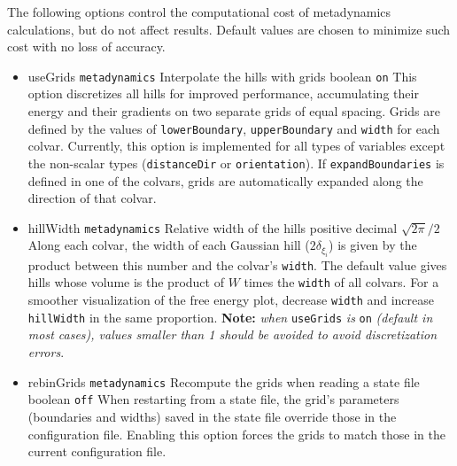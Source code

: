 \label{sec:colvarbias_meta_performance}
The following options control the computational cost of metadynamics calculations, but do not affect results.
Default values are chosen to minimize such cost with no loss of accuracy.

\begin{itemize}

\item %
  \keydef
    {useGrids}{%
    \texttt{metadynamics}}{%
    Interpolate the hills with grids}{%
    boolean}{%
    \texttt{on}}{%
    This option discretizes all hills for improved performance,
    accumulating their energy and their gradients on two separate grids
    of equal spacing.  Grids are defined by the values of
    \texttt{lowerBoundary}, \texttt{upperBoundary} and \texttt{width}
    for each colvar.  Currently, this option is implemented for all
    types of variables except the non-scalar types (\texttt{distanceDir}
    or \texttt{orientation}).  If \texttt{expandBoundaries} is defined
    in one of the colvars, grids are automatically expanded along the
    direction of that colvar.}

\item %
  \keydef
    {hillWidth}{%
    \texttt{metadynamics}}{%
    Relative width of the hills}{%
    positive decimal}{%
    $\sqrt{2\pi}/2$}{%
    Along each colvar, the width of each Gaussian hill
    ($2\delta_{\xi_{i}}$) is given by the product between this number
    and the colvar's \texttt{width}.  The default value gives hills
    whose volume is the product of $W$ times the \texttt{width} of all
    colvars.  For a smoother visualization of the free energy plot,
    decrease \texttt{width} and increase \texttt{hillWidth} in the same
    proportion.  \textbf{Note:} \emph{when }\texttt{useGrids}\emph{ is
    }\texttt{on}\emph{ (default in most cases), values smaller than 1
      should be avoided to avoid discretization errors}.}

\item %
  \keydef
    {rebinGrids}{%
    \texttt{metadynamics}}{%
    Recompute the grids when reading a state
    file}{%
    boolean}{%
    \texttt{off}}{%
    When restarting from a state file, the grid's parameters (boundaries
    and widths) saved in the state file override those in the
    configuration file.  Enabling this option forces the grids to match
    those in the current configuration file.}

\end{itemize}


